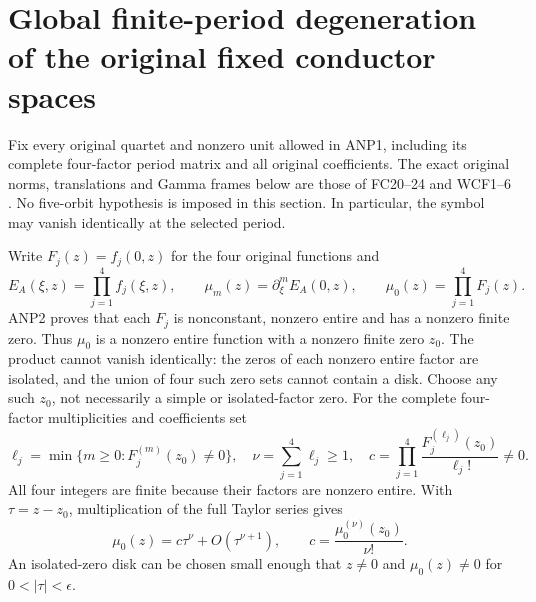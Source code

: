 \section{Global finite-period degeneration of the original fixed conductor spaces}
Fix every original quartet and nonzero unit allowed in ANP1, including
its complete four-factor period matrix and all original coefficients.
The exact original norms, translations and Gamma frames below are those
of FC20--24 and WCF1--6 \cite{WCF,Cumulative,PCLOriginal}.
No five-orbit hypothesis is imposed in this section. In particular,
the symbol may vanish identically at the selected period.

Write $F_j(z)=f_j(0,z)$ for the four original functions and
\[
 E_A(\xi,z)=\prod_{j=1}^4 f_j(\xi,z),\qquad
 \mu_m(z)=\partial_\xi^mE_A(0,z),\qquad
 \mu_0(z)=\prod_{j=1}^4F_j(z).
 \tag{GFC1}
\]
ANP2 proves that each $F_j$ is nonconstant, nonzero entire and has a
nonzero finite zero. Thus $\mu_0$ is a nonzero entire function with a
nonzero finite zero $z_0$. The product cannot vanish identically:
the zeros of each nonzero entire factor are isolated, and the union
of four such zero sets cannot contain a disk.
Choose any such $z_0$, not necessarily a simple or isolated-factor zero.
For the complete four-factor multiplicities and coefficients set
\[
 \ell_j=\min\{m\ge0:F_j^{(m)}(z_0)\ne0\},\quad
 \nu=\sum_{j=1}^4\ell_j\ge1,\quad
 c=\prod_{j=1}^4\frac{F_j^{(\ell_j)}(z_0)}{\ell_j!}\ne0.
 \tag{GFC2}
\]
All four integers are finite because their factors are nonzero entire.
With $\tau=z-z_0$, multiplication of the full Taylor series gives
\[
 \mu_0(z)=c\tau^\nu+O(\tau^{\nu+1}),\qquad
 c=\frac{\mu_0^{(\nu)}(z_0)}{\nu!}.
 \tag{GFC3}
\]
An isolated-zero disk can be chosen small enough that $z\ne0$ and
$\mu_0(z)\ne0$ for $0<|\tau|<\epsilon$.

